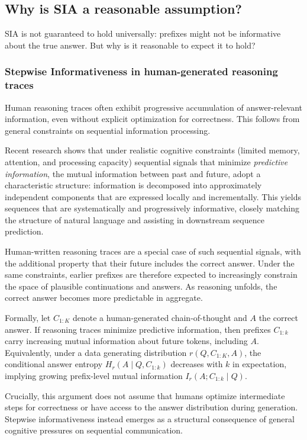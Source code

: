 \documentclass{article}
\begin{document}
\subsection{Why is SIA a reasonable assumption?}
\label{subsec:SIA_reasonable}

SIA is not guaranteed to hold universally: prefixes might not be informative about the true answer. But why is it reasonable to expect it to hold?

\subsubsection{Stepwise Informativeness in human-generated reasoning traces}

Human reasoning traces often exhibit progressive accumulation of answer-relevant information, even without explicit optimization for correctness. This follows from general constraints on sequential information processing.

Recent research  \cite{futrell_linguistic_2025} shows that under realistic cognitive constraints (limited memory, attention, and processing capacity) sequential signals that minimize \textit{predictive information}, the mutual information between past and future, adopt a characteristic structure: information is decomposed into approximately independent components that are expressed locally and incrementally. This yields sequences that are systematically and progressively informative, closely matching the structure of natural language and assisting in downstream sequence prediction. 

Human-written reasoning traces are a special case of such sequential signals, with the additional property that their future includes the correct answer. Under the same constraints, earlier prefixes are therefore expected to increasingly constrain the space of plausible continuations and answers. As reasoning unfolds, the correct answer becomes more predictable in aggregate.

Formally, let \(C_{1:K}\) denote a human-generated chain-of-thought and \(A\) the correct answer. If reasoning traces minimize predictive information, then prefixes \(C_{1:k}\) carry increasing mutual information about future tokens, including \(A\). Equivalently, under a data generating distribution $r(Q,C_{1:K},A)$, the conditional answer entropy \(H_r(A \mid Q, C_{1:k})\) decreases with \(k\) in expectation, implying growing prefix-level mutual information \(I_r(A; C_{1:k} \mid Q)\).

Crucially, this argument does not assume that humans optimize intermediate steps for correctness or have access to the answer distribution during generation. Stepwise informativeness instead emerges as a structural consequence of general cognitive pressures on sequential communication.
\end{document}
